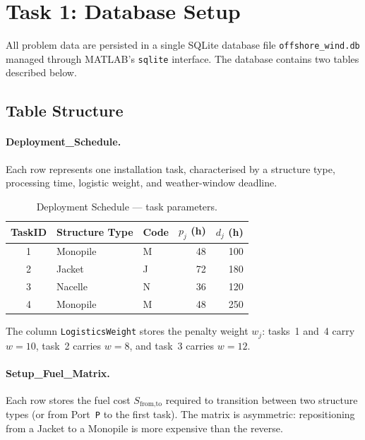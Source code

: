 \documentclass[11pt,a4paper]{article}
\begin{document}
\section{Task 1: Database Setup}
All problem data are persisted in a single SQLite database file
\texttt{offshore\_wind.db} managed through MATLAB's \texttt{sqlite}
interface. The database contains two tables described below.

\subsection{Table Structure}

\paragraph{Deployment\_Schedule.}
Each row represents one installation task, characterised by a structure type,
processing time, logistic weight, and weather-window deadline.

\begin{table}[H]
\centering
\caption{Deployment Schedule — task parameters.}
\label{tab:deployment}
\begin{tabular}{cllrr}
\toprule
\textbf{TaskID} & \textbf{Structure Type} & \textbf{Code} & \textbf{$p_j$ (h)} & \textbf{$d_j$ (h)} \\
\midrule
1 & Monopile & M & 48 & 100 \\
2 & Jacket   & J & 72 & 180 \\
3 & Nacelle  & N & 36 & 120 \\
4 & Monopile & M & 48 & 250 \\
\bottomrule
\end{tabular}
\end{table}

The column \texttt{LogisticsWeight} stores the penalty weight $w_j$: tasks~1
and~4 carry $w = 10$, task~2 carries $w = 8$, and task~3 carries $w = 12$.

\paragraph{Setup\_Fuel\_Matrix.}
Each row stores the fuel cost $S_{\text{from},\text{to}}$ required to
transition between two structure types (or from Port~\texttt{P} to the first
task). The matrix is asymmetric: repositioning from a Jacket to a Monopile is
more expensive than the reverse.
\end{document}
